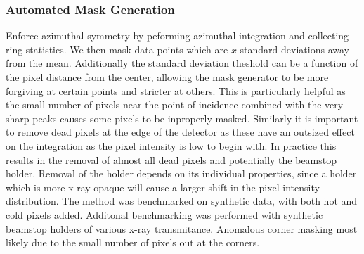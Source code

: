 \subsubsection{Automated Mask Generation}
Enforce azimuthal symmetry by peforming azimuthal integration and collecting ring statistics.  
We then mask data points which are $x$ standard deviations away from the mean.
Additionally the standard deviation theshold can be a function of the pixel distance from the center, allowing the mask generator to be more forgiving at certain points and stricter at others.
This is particularly helpful as the small number of pixels near the point of incidence combined with the very sharp peaks causes some pixels to be inproperly masked.
Similarly it is important to remove dead pixels at the edge of the detector as these have an outsized effect on the integration as the pixel intensity is low to begin with.
In practice this results in the removal of almost all dead pixels and potentially the beamstop holder.
Removal of the holder depends on its individual properties, since a holder which is more x-ray opaque will cause a larger shift in the pixel intensity distribution.
The method was benchmarked on synthetic data, with both hot and cold pixels added.
Additonal benchmarking was performed with synthetic beamstop holders of various x-ray transmitance.
Anomalous corner masking most likely due to the small number of pixels out at the corners.
